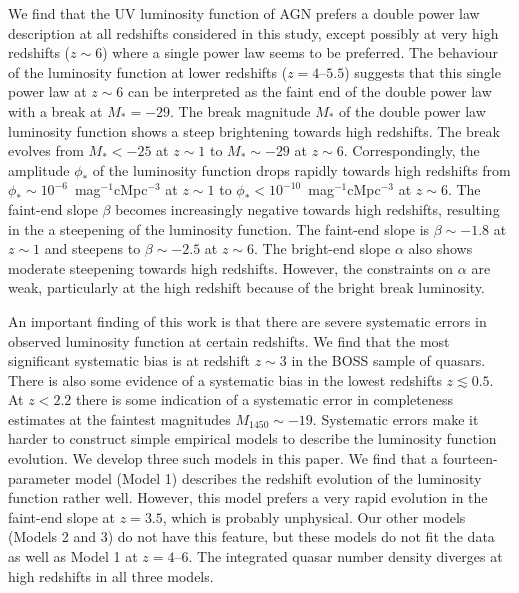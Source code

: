 \documentclass[fleqn,usenatbib]{mnras}
\begin{document}
We find that the UV luminosity function of AGN prefers a double power
law description at all redshifts considered in this study, except
possibly at very high redshifts ($z\sim 6$) where a single power law
seems to be preferred.  The behaviour of the luminosity function at
lower redshifts ($z=4$--$5.5$) suggests that this single power law at
$z\sim 6$ can be interpreted as the faint end of the double power law
with a break at $M_*=-29$.  The break magnitude $M_*$ of the double
power law luminosity function shows a steep brightening towards high
redshifts.  The break evolves from $M_*<-25$ at $z\sim 1$ to $M_*\sim
-29$ at $z\sim 6$.  Correspondingly, the amplitude $\phi_*$ of the
luminosity function drops rapidly towards high redshifts from
$\phi_*\sim 10^{-6}$~mag$^{-1}$cMpc$^{-3}$ at $z\sim 1$ to $\phi_*<
10^{-10}$~mag$^{-1}$cMpc$^{-3}$ at $z\sim 6$.  The faint-end slope
$\beta$ becomes increasingly negative towards high redshifts,
resulting in the a steepening of the luminosity function.  The
faint-end slope is $\beta\sim -1.8$ at $z\sim 1$ and steepens to
$\beta\sim-2.5$ at $z\sim 6$.  The bright-end slope $\alpha$ also
shows moderate steepening towards high redshifts.  However, the
constraints on $\alpha$ are weak, particularly at the high redshift
because of the bright break luminosity.

An important finding of this work is that there are severe systematic
errors in observed luminosity function at certain redshifts.  We find
that the most significant systematic bias is at redshift $z\sim 3$ in
the BOSS sample of quasars.  There is also some evidence of a
systematic bias in the lowest redshifts $z\lesssim 0.5$.  At $z<2.2$
there is some indication of a systematic error in completeness
estimates at the faintest magnitudes $M_{1450}\sim -19$.  Systematic
errors make it harder to construct simple empirical models to describe
the luminosity function evolution.  We develop three such models in
this paper.  We find that a fourteen-parameter model (Model 1)
describes the redshift evolution of the luminosity function rather
well.  However, this model prefers a very rapid evolution in the
faint-end slope at $z=3.5$, which is probably unphysical.  Our other
models (Models 2 and 3) do not have this feature, but these models do
not fit the data as well as Model 1 at $z=4$--$6$.  The integrated
quasar number density diverges at high redshifts in all three models.
\end{document}
